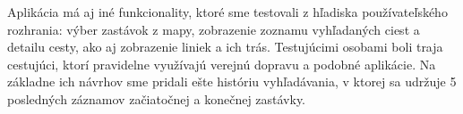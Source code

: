 Aplikácia má aj iné funkcionality, ktoré sme testovali z hľadiska používateľského rozhrania: výber zastávok z mapy, zobrazenie zoznamu vyhľadaných ciest a detailu cesty, ako aj zobrazenie liniek a ich trás. Testujúcimi osobami boli traja cestujúci, ktorí pravidelne využívajú verejnú dopravu a  podobné aplikácie. Na základne ich návrhov sme pridali ešte históriu vyhľadávania, v ktorej sa udržuje 5 posledných záznamov začiatočnej a konečnej zastávky. 



